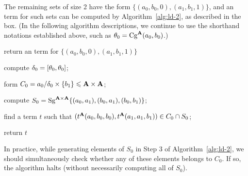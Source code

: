 The remaining sets of size 2 have the form
$\{(a_0,b_0,0), (a_1, b_1, 1)\}$, and 
an \ld term for such sets can be computed by
Algorithm~\ref{alg:ld-2}, as described in the box.
(In the following algorithm descriptions,
we continue to use the shorthand notations established above, 
such as $\theta_0 = \operatorname{Cg}^{\mathbf{A}}(a_0, b_0)$.)

\LinesNumbered
\begin{algorithm}%

  \caption{return an \ld term for $\{(a_0,b_0,0), (a_1, b_1, 1)\}$
          \label{alg:ld-2}  }

compute $\delta_0=[\theta_0, \theta_0]$;

form $C_0= a_0/\delta_0 \times \{b_1\} \leqslant \mathbf{A}\times\mathbf{A}$;

compute
      $S_0=\operatorname{Sg}^{\mathbf{A}\times \mathbf{A}} \{(a_0,a_1),(b_0,a_1),(b_0,b_1)\}$;

find a term $t$ such that
 $(t^{\mathbf{A}}(a_0,b_0,b_0), t^{\mathbf{A}}(a_1,a_1,b_1)) \in C_0 \cap S_0$;

return $t$
\end{algorithm}

\begin{rem}
  In practice, while generating elements of $S_0$ in Step 3
  of Algorithm~\ref{alg:ld-2}, we should simultaneously check whether
  any of these elements belongs to $C_0$.  If so, the algorithm
  halts (without necessarily computing all of $S_0$).
\end{rem}

